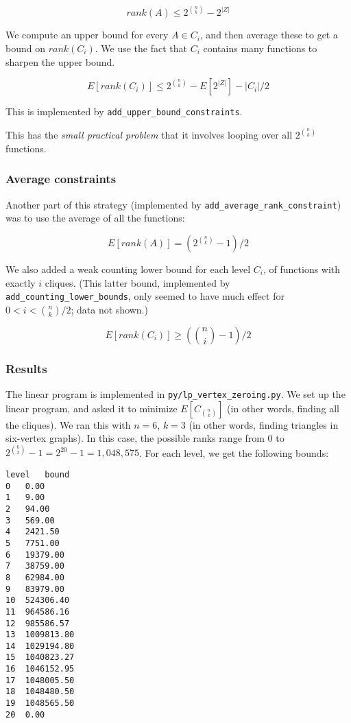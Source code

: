 \documentclass[12pt]{article}
\theoremstyle{definition}
\begin{document}
\[
rank(A) \le 2^{n \choose k} - 2^{|Z|}
\]

We compute an upper bound for every $A \in C_i$, and then average these
to get a bound on $rank(C_i)$. We use the fact that $C_i$ contains many
functions to sharpen the upper bound.

\[
E[rank(C_i)] \le 2^{n \choose k} - E[2^{|Z|}] - |C_i|/2
\]

This is implemented by {\tt add\_upper\_bound\_constraints}.

This has the {\em small practical problem} that it involves
looping over all $2^{n \choose k}$ functions.

\subsubsection{Average constraints}

Another part of this strategy 
(implemented by {\tt add\_average\_rank\_constraint}) was
to use the average of all the functions:

\[
E[rank(A)] = (2^{n \choose k} - 1) / 2
\]

We also added a weak counting lower bound for each level $C_i$, of functions
with exactly $i$ cliques. (This latter bound, implemented by
{\tt add\_counting\_lower\_bounds}, only seemed to have much
effect for $0 < i < {n \choose k}/2$; data not shown.)

\[
E[rank(C_i)] \ge ({n \choose i} - 1) / 2
\]

\subsubsection{Results}

The linear program is implemented in {\tt py/lp\_vertex\_zeroing.py}.
We set up the linear program, and asked it to minimize $E[C_{n \choose k}]$
(in other words, finding all the cliques). We ran this with $n=6$, $k=3$
(in other words, finding triangles in six-vertex graphs). In this case,
the possible ranks range from $0$ to $2^{6 \choose 3}-1 = 2^{20}-1 = 1,048,575$.
For each level, we get the following bounds:

\begin{verbatim}
level	bound
0	0.00
1	9.00
2	94.00
3	569.00
4	2421.50
5	7751.00
6	19379.00
7	38759.00
8	62984.00
9	83979.00
10	524306.40
11	964586.16
12	985586.57
13	1009813.80
14	1029194.80
15	1040823.27
16	1046152.95
17	1048005.50
18	1048480.50
19	1048565.50
20	0.00
\end{verbatim}
\end{document}

